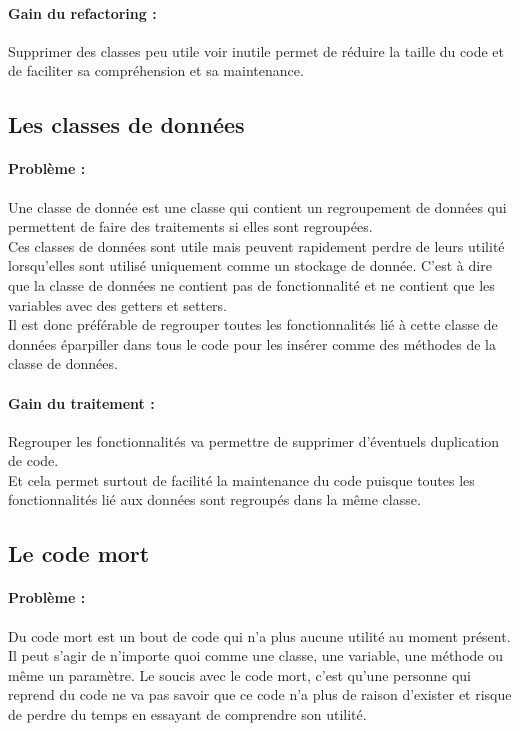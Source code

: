 \documentclass[a4paper,twoside,12pt,openright]{report}
\begin{document}
\paragraph{Gain du refactoring :}
Supprimer des classes peu utile voir inutile permet de réduire la taille du code et de faciliter sa compréhension et sa maintenance.\\

\subsection{Les classes de données}
\paragraph{Problème :}
Une classe de donnée est une classe qui contient un regroupement de données qui permettent de faire des traitements si elles sont regroupées.\\
Ces classes de données sont utile mais peuvent rapidement perdre de leurs utilité lorsqu'elles sont utilisé uniquement comme un stockage de donnée. C'est à dire que la classe de données ne contient pas de fonctionnalité et ne contient que les variables avec des getters et setters.\\
Il est donc préférable de regrouper toutes les fonctionnalités lié à cette classe de données éparpiller dans tous le code pour les insérer comme des méthodes de la classe de données.\\ 

\paragraph{Gain du traitement :}
Regrouper les fonctionnalités va permettre de supprimer d'éventuels  duplication de code.\\
Et cela permet surtout de facilité la maintenance du code puisque toutes les fonctionnalités lié aux données sont regroupés dans la même classe.\\

\subsection{Le code mort}
\paragraph{Problème :}
Du code mort est un bout de code qui n'a plus aucune utilité au moment présent. Il peut s'agir de n'importe quoi comme une classe, une variable, une méthode ou même un paramètre.
Le soucis avec le code mort, c'est qu'une personne qui reprend du code ne va pas savoir que ce code n'a plus de raison d'exister et risque de perdre du temps en essayant de comprendre son utilité.\\
\end{document}
